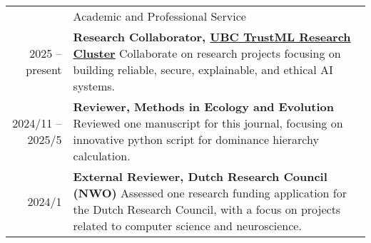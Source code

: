 \documentclass[letterpaper, 11pt]{article}
\newcommand{\headingfont}{\Large\color{OliveGreen}}
\newenvironment{SectionTable}[1]{
	\renewcommand*{\arraystretch}{1.7}
	\setlength{\tabcolsep}{10pt}
	\begin{longtable}{Rp{5.2in}} & #1 \\}
{\end{longtable}\vspace{-.3cm}}
\begin{document}
\begin{SectionTable}{\headingfont Academic and Professional Service}
2025 -- present &
\textbf{Research Collaborator, \href{https://trustml.ubc.ca/profiles/sky-sheng}{UBC TrustML Research Cluster}} \newline
Collaborate on research projects focusing on building reliable, secure, explainable, and ethical AI systems. \\
2024/11 -- 2025/5 &
\textbf{Reviewer, Methods in Ecology and Evolution} \newline
Reviewed one manuscript for this journal, focusing on innovative python script for dominance hierarchy calculation. \\
2024/1 &
\textbf{External Reviewer, Dutch Research Council (NWO)} \newline
Assessed one research funding application for the Dutch Research Council, with a focus on projects related to computer science and neuroscience. \\
\end{SectionTable}
\end{document}

